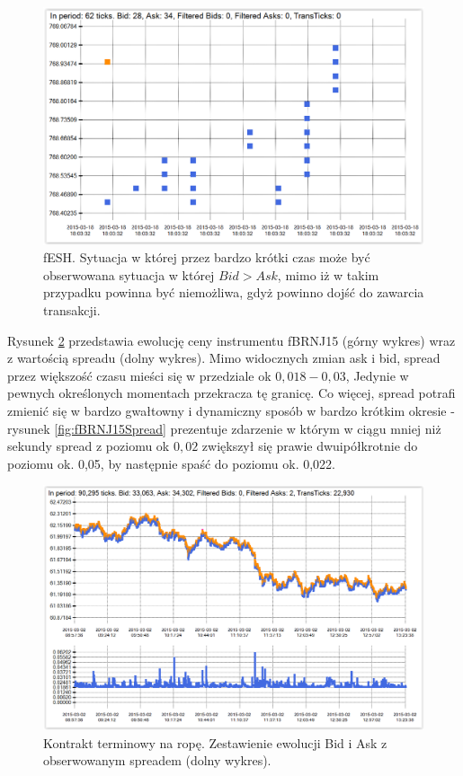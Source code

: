 \documentclass[a4paper,12pt,openany, DIV=calc, headsepline]{scrbook}
\begin{document}
\begin{figure}[H]
  \centering
  \includegraphics[scale=0.5]{wykresy/fpah15.PNG}
  \caption{fESH. Sytuacja w której przez bardzo krótki czas może być obserwowana sytuacja w której $Bid > Ask$, mimo iż w takim przypadku powinna być niemożliwa, gdyż powinno dojść do zawarcia transakcji.}
  \label{fig:fpah15}
\end{figure}

Rysunek \ref{fig:fBRNJ15} przedstawia ewolucję ceny instrumentu fBRNJ15 (górny wykres) wraz z wartością spreadu (dolny wykres). Mimo widocznych zmian ask i bid, spread przez większość czasu mieści się w przedziale ok $0,018-0,03$, Jedynie w pewnych określonych momentach przekracza tę granicę. Co więcej, spread potrafi zmienić się w bardzo gwałtowny i dynamiczny sposób w bardzo krótkim okresie - rysunek \ref{fig:fBRNJ15Spread} prezentuje zdarzenie w którym w ciągu mniej niż sekundy spread z poziomu ok $0,02$ zwiększył się prawie dwuipółkrotnie do poziomu ok. 0,05, by następnie spaść do poziomu ok. 0,022. 

\begin{figure}[H]
  \centering
  \includegraphics[scale=0.5]{wykresy/fBRNJ15.PNG}
  \caption{Kontrakt terminowy na ropę. Zestawienie ewolucji Bid i Ask z obserwowanym spreadem (dolny wykres).}
  \label{fig:fBRNJ15}
\end{figure}
\end{document}
